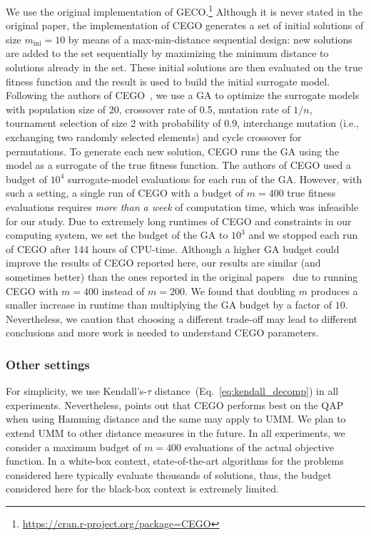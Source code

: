 \documentclass[sigconf,dvipsnames]{acmart}
\newcommand{\minit}{\ensuremath{m_\text{ini}}\xspace}
\newcommand{\FEmax}{\ensuremath{m}}
\begin{document}
We use the original implementation of GECO.\footnote{\url{https://cran.r-project.org/package=CEGO}} %
Although it is never stated in the original paper, the implementation of CEGO
generates a set of initial solutions of size $\minit=10$ by means of a
max-min-distance sequential design: new solutions are added to the set
sequentially by maximizing the minimum distance to solutions already in the
set. These initial solutions are then evaluated on the true fitness function
and the result is used to build the initial surrogate
model. %
Following the authors of
CEGO~\citep{ZaeStoFriFisNauBar2014,ZaeStoBar2014:ppsn}, we use a GA to optimize
the surrogate models with population size of 20, crossover rate of 0.5,
mutation rate of $1/n$, tournament selection of size 2 with probability of 0.9,
interchange mutation (i.e., exchanging two randomly selected elements) and
cycle crossover for permutations. To generate each new solution, CEGO runs the
GA using the model as a surrogate of the true fitness function.  The authors of
CEGO used a budget of $10^4$ surrogate-model evaluations for each run of the
GA. However, with such a setting, a single run of CEGO with a budget of
$\FEmax=400$ true fitness evaluations requires \emph{more than a week} of
computation time, which was infeasible for our study. Due to extremely long
runtimes of CEGO and constraints in our computing system, we set the budget of
the GA to $10^3$ and we stopped each run of CEGO after 144 hours of CPU-time.
Although a higher GA budget could improve the results of CEGO reported here,
our results are similar (and sometimes better) than the ones reported in the
original papers~\citep{ZaeStoFriFisNauBar2014,ZaeStoBar2014:ppsn} due to
running CEGO with $\FEmax=400$ instead of $\FEmax=200$. We found that
doubling $\FEmax$ produces a smaller increase in runtime than multiplying the
GA budget by a factor of $10$. Nevertheless, we caution that choosing a
different trade-off may lead to different conclusions and more work is needed
to understand CEGO parameters.


\subsubsection{Other settings}
%
For simplicity, we use Kendall's-$\tau$
distance~(Eq.~\ref{eq:kendall_decomp}) in all experiments. Nevertheless,
\citet{ZaeStoFriFisNauBar2014} points out that CEGO performs best on the QAP
when using Hamming distance and the same may apply to UMM.
We plan to extend UMM to other distance measures in the future.  In all
experiments, we consider a maximum budget of $\FEmax=400$ evaluations of the
actual objective function. In a white-box context, state-of-the-art algorithms
for the problems considered here typically evaluate thousands of solutions,
thus, the budget considered here for the black-box context is extremely
limited.
\end{document}
